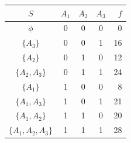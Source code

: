\documentclass[mathserif]{beamer}
\begin{document}
{\begin{itemize}
\begin{figure}
\begin{tikzpicture}[scale=0.45, auto,swap]

          
\end{tikzpicture}
\end{figure}

\begin{table}
\begin{small}
  \begin{tabular}{c|ccc|r}
  \hline 
  \hline 
  $S$ & $A_1$ & $A_2$ & $A_3$ & $f$ \\ 
  \hline 
  $\phi$ & 0 & 0 & 0 & 0 \\ 
  $\{A_3\}$ & 0 & 0 & 1 & 16 \\ 
  $\{A_2\}$ & 0 & 1 & 0 & 12 \\ 
  $\{A_2, A_3\}$ & 0 & 1 & 1 & 24 \\ 
  $\{A_1\}$ & 1 & 0 & 0 & 8 \\ 
  $\{A_1, A_3\}$ & 1 & 0 & 1 & 21 \\ 
  $\{A_1, A_2\}$ & 1 & 1 & 0 & 20 \\ 
  $\{A_1, A_2, A_3\}$ & 1 & 1 & 1 & 28 \\ 
  \hline \hline 
  \end{tabular}
 \end{small}  
  \end{table} 
  
 
	\end{itemize}
 }
\end{document}
